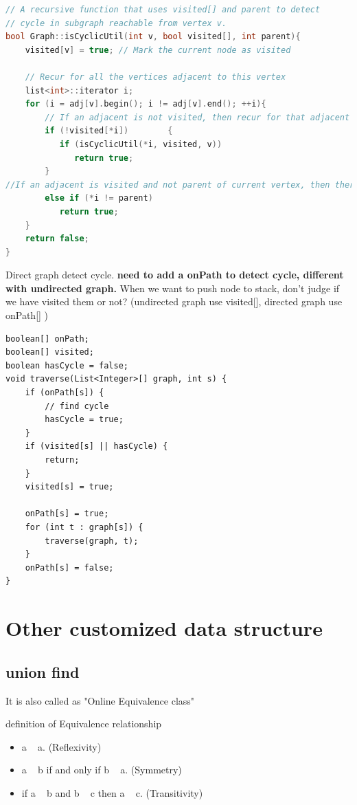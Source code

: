 \documentclass[a4paper,11pt,twoside]{book}
\begin{document}
\begin{lstlisting}[frame=single, language=c++]
// A recursive function that uses visited[] and parent to detect
// cycle in subgraph reachable from vertex v.
bool Graph::isCyclicUtil(int v, bool visited[], int parent){
    visited[v] = true; // Mark the current node as visited
 
    // Recur for all the vertices adjacent to this vertex
    list<int>::iterator i;
    for (i = adj[v].begin(); i != adj[v].end(); ++i){
        // If an adjacent is not visited, then recur for that adjacent
        if (!visited[*i])        {
           if (isCyclicUtil(*i, visited, v))
              return true;
        }
//If an adjacent is visited and not parent of current vertex, then there is a cycle.
        else if (*i != parent)
           return true;
    }
    return false;
}
\end{lstlisting}



	\par Direct graph detect cycle. \textbf{need to add a onPath to detect cycle, different with undirected graph.} When we want to push node to stack, don't judge if we have visited them or not?  (undirected graph use visited[], directed graph use onPath[] )
	
\begin{lstlisting}
boolean[] onPath;
boolean[] visited;
boolean hasCycle = false;
void traverse(List<Integer>[] graph, int s) {
	if (onPath[s]) {
		// find cycle
		hasCycle = true;
	}
	if (visited[s] || hasCycle) {
		return;
	}
	visited[s] = true;

	onPath[s] = true;
	for (int t : graph[s]) {
		traverse(graph, t);
	}
	onPath[s] = false;
}
\end{lstlisting}



\section{Other customized data structure}

\subsection{union find}

	\par It is also called as "Online Equivalence class"
	
	\par definition of Equivalence relationship
	\begin{itemize}
		\item a ~ a. (Reflexivity)
		\item a ~ b if and only if b ~ a. (Symmetry)
		\item if a ~ b and b ~ c then a ~ c. (Transitivity)
	\end{itemize}
	
\end{document}
